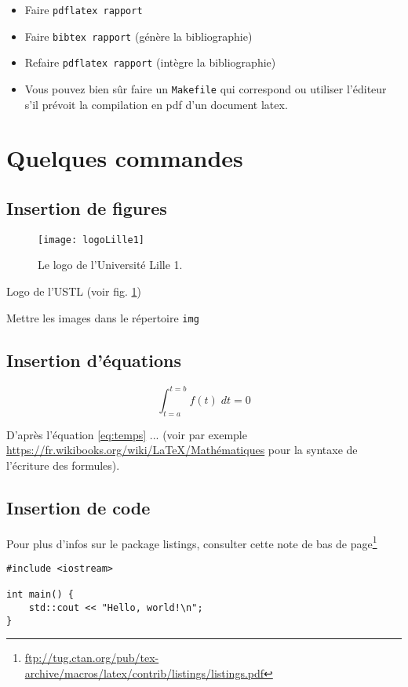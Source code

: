 \documentclass{pjsivi}
\begin{document}
\begin{itemize}
\item Faire \verb#pdflatex rapport#
\item Faire \verb#bibtex rapport# (génère la bibliographie)
\item Refaire \verb#pdflatex rapport# (intègre la bibliographie)
\item Vous pouvez bien sûr faire un \verb#Makefile# qui correspond ou utiliser l'éditeur s'il prévoit la compilation en pdf d'un document latex.
\end{itemize}

\section{Quelques commandes}
\subsection{Insertion de figures}

\begin{figure}[!ht]
  \centering
  \texttt{[image: logoLille1]}
  \caption{Le logo de l'Université Lille 1.}
  \label{fig:ustl}
\end{figure}

Logo de l'USTL (voir fig. \ref{fig:ustl})

Mettre les images dans le répertoire \texttt{img}

\subsection{Insertion d'équations}

\begin{equation}
\int_{t=a}^{t=b}f(t)\;dt = 0 \label{eq:temps}
\end{equation}

D'après l'équation \ref{eq:temps} ... (voir par exemple \url{https://fr.wikibooks.org/wiki/LaTeX/Mathématiques} pour la syntaxe de l'écriture des formules).

\subsection{Insertion de code}

Pour plus d'infos sur le package listings, consulter cette note de bas de page\footnote{
\url{ftp://tug.ctan.org/pub/tex-archive/macros/latex/contrib/listings/listings.pdf}
}


\begin{lstlisting}[frame=trBL]
#include <iostream>

int main() {
    std::cout << "Hello, world!\n";
}
\end{lstlisting}
\end{document}
